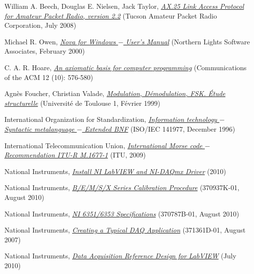\documentclass[a4paper]{report}
\begin{document}
\begin{thebibliography}{99}
William A. Beech, Douglas E. Nielsen, Jack Taylor, {\it \href{http://www.tapr.org/pdf/AX25.2.2.pdf}{AX.25 Link Access Protocol for Amateur Packet Radio, version 2.2}} (Tucson Amateur Packet Radio Corporation, July 2008)

Michael R. Owen, {\it \href{http://www.nlsa.com/docs/nfwdoc.pdf}{Nova for Windows $-$ User's Manual}} (Northern Lights Software Associates, February 2000)

C. A. R. Hoare, {\it \href{http://www.spatial.maine.edu/~worboys/processes/hoare%20axiomatic.pdf}{An axiomatic basis for computer programming}} (Communications of the ACM 12 (10): 576-580)

Agn\`es Foucher, Christian Valade, {\it \href{http://radiomods.free.fr/r2000-info/mod_dem_fsk.pdf}{Modulation, D\'emodulation, FSK. \'Etude structurelle}} (Universit\'e de Toulouse 1, F\'evrier 1999)

International Organization for Standardization, {\it \href{http://standards.iso.org/ittf/PubliclyAvailableStandards/s026153_ISO_IEC_14977_1996(E).zip}{Information technology $-$ Syntactic metalanguage $-$ Extended BNF}} (ISO/IEC 141977, December 1996)

International Telecommunication Union, {\it \href{http://www.itu.int/rec/R-REC-M.1677-1-200910-I/}{International Morse code $-$ Recommendation ITU-R M.1677-1}} (ITU, 2009)

National Instruments, {\it \href{http://www.ni.com/gettingstarted/installsoftware/dataacquisition.htm}{Install NI LabVIEW and NI-DAQmx Driver}} (2010)

National Instruments, {\it \href{http://www.ni.com/pdf/manuals/370937k.pdf}{B/E/M/S/X Series Calibration Procedure}} (370937K-01, August 2010)

National Instruments, {\it \href{http://www.ni.com/pdf/manuals/370787b.pdf}{NI 6351/6353 Specifications}} (370787B-01, August 2010)

National Instruments, {\it \href{http://zone.ni.com/reference/en-XX/help/371361D-01/lvmeasconcepts/creating_daq_app/}{Creating a Typical DAQ Application}} (371361D-01, August 2007)

National Instruments, {\it \href{http://zone.ni.com/devzone/cda/tut/p/id/11805}{Data Acquisition Reference Design for LabVIEW}} (July 2010)


\end{thebibliography}
\end{document}
